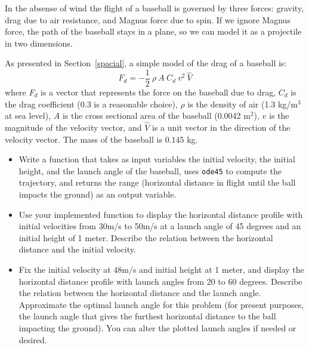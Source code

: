 \documentclass{book}
\begin{document}
\begin{ex}
\label{baseball}

In the absense of wind the flight of a baseball is governed by three forces: gravity,
drag due to air resistance, and Magnus force due to spin.  If
we ignore Magnus force, the path of the baseball stays
in a plane, so we can model it as a projectile in two
dimensions.

As presented in Section~\ref{spacial}, a 
simple model of the drag of a baseball is:
%
\[ F_d = -\frac{1}{2} ~ \rho ~ A ~ C_d ~ v^2 ~ \hat{V}   \]
%
where $F_d$ is a vector that represents the force on the baseball due
to drag, $C_d$ is the drag coefficient (0.3 is a reasonable choice),
$\rho$ is the density of air (1.3 kg/m$^3$ at sea level), $A$ is the
cross sectional area of the baseball (0.0042 m$^2$), $v$ is the
magnitude of the velocity vector, and $\hat{V}$ is a unit vector in
the direction of the velocity vector.  The mass of the baseball is
$0.145$ kg.

\begin{itemize}

\item Write a function that takes 
as input variables
the initial velocity, the initial height, and the launch angle of the baseball,
uses {\tt ode45} to compute
the trajectory, and returns the range (horizontal distance in flight until
the ball impacts the ground)
as an output variable.

\item Use your implemented function to display the horizontal distance profile 
with initial velocities from 30m/s to 50m/s at a launch angle of 45 degrees 
and an initial height of 1 meter.
Describe the relation between the horizontal distance and the initial velocity. 

\item Fix the initial velocity at 48m/s and initial height at 1 meter, and display 
the horizontal distance profile 
with launch angles from 20 to 60 degrees. Describe the relation between 
the horizontal distance and the launch angle.  Approximate the optimal 
launch angle for this problem (for present purposes, the launch angle that gives the furthest horizontal distance to the ball impacting the ground).
You can alter the plotted launch angles if needed or desired.  

\end{itemize}

\end{ex}
\end{document}

